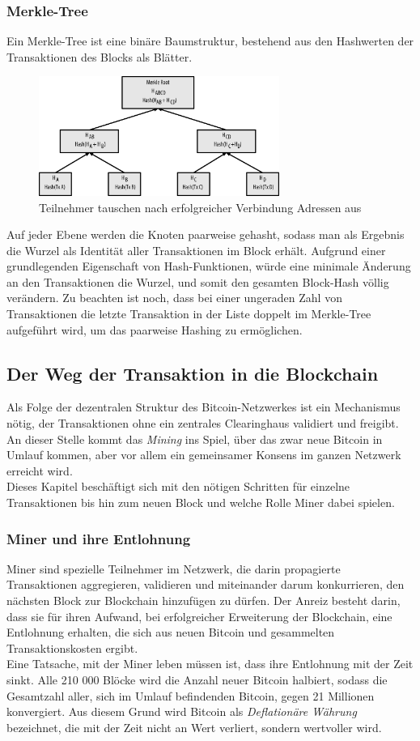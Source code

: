 \subsubsection{Merkle-Tree}
Ein Merkle-Tree ist eine binäre Baumstruktur, bestehend aus den Hashwerten der Transaktionen des Blocks als Blätter.
\begin{figure}[htpb]
	\centering
	\includegraphics[width=0.7\textwidth]{images/merkle.png}
	\caption{Teilnehmer tauschen nach erfolgreicher Verbindung Adressen aus}
	\label{6braun:fig:merkle}
\end{figure}
Auf jeder Ebene werden die Knoten paarweise gehasht, sodass man als Ergebnis die Wurzel als Identität aller Transaktionen im Block erhält. 
Aufgrund einer grundlegenden Eigenschaft von Hash-Funktionen, würde eine minimale Änderung an den Transaktionen die Wurzel, und somit den gesamten Block-Hash völlig verändern. 
Zu beachten ist noch, dass bei einer ungeraden Zahl von Transaktionen die letzte Transaktion in der Liste doppelt im Merkle-Tree aufgeführt wird, um das paarweise Hashing zu ermöglichen.
\subsection{Der Weg der Transaktion in die Blockchain}
Als Folge der dezentralen Struktur des Bitcoin-Netzwerkes ist ein Mechanismus nötig, der Transaktionen ohne ein zentrales Clearinghaus validiert und freigibt. An dieser Stelle kommt das \emph{Mining} ins Spiel, über das zwar neue Bitcoin in Umlauf kommen, aber vor allem ein gemeinsamer Konsens im ganzen Netzwerk erreicht wird. \\
Dieses Kapitel beschäftigt sich mit den nötigen Schritten für einzelne Transaktionen bis hin zum neuen Block und welche Rolle Miner dabei spielen.
\subsubsection{Miner und ihre Entlohnung}
Miner sind spezielle Teilnehmer im Netzwerk, die darin propagierte Transaktionen aggregieren, validieren und miteinander darum konkurrieren, den nächsten Block zur Blockchain hinzufügen zu dürfen. 
Der Anreiz besteht darin, dass sie für ihren Aufwand, bei erfolgreicher Erweiterung der Blockchain, eine Entlohnung erhalten, die sich aus neuen Bitcoin und gesammelten Transaktionskosten ergibt.\\
Eine Tatsache, mit der Miner leben müssen ist, dass ihre Entlohnung mit der Zeit sinkt. 
Alle 210 000 Blöcke wird die Anzahl neuer Bitcoin halbiert, sodass die Gesamtzahl aller, sich im Umlauf befindenden Bitcoin, gegen 21 Millionen konvergiert. 
Aus diesem Grund wird Bitcoin als \emph{Deflationäre Währung} bezeichnet, die mit der Zeit nicht an Wert verliert, sondern wertvoller wird.\\
